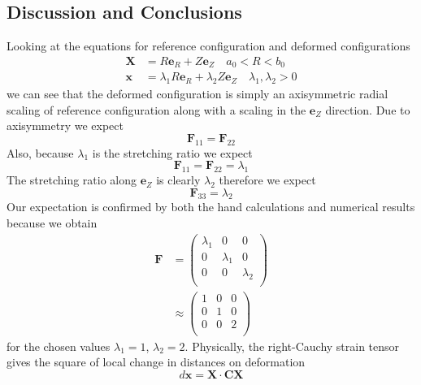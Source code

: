\documentclass[../main.tex]{subfiles}
\begin{document}
        \subsection{Discussion and Conclusions}
        Looking at the equations for reference configuration and
        deformed configurations
        \begin{align*}
          \mathbf{X} &= R\mathbf{e}_R + Z\mathbf{e}_Z\quad a_0<R<b_0\\
          \mathbf{x} &= \lambda_1R\mathbf{e}_R+\lambda_2Z\mathbf{e}_Z\quad \lambda_1,\lambda_2 > 0
        \end{align*}
        we can see that the deformed configuration is simply an
        axisymmetric radial scaling of reference configuration along
        with a scaling in the $\mathbf{e}_Z$ direction. Due to
        axisymmetry we expect
        \[\mathbf{F}_{11} = \mathbf{F}_{22}\]
        Also, because $\lambda_1$ is the stretching ratio we expect
        \[\mathbf{F}_{11}=\mathbf{F}_{22}=\lambda_1\]
        The stretching ratio along $\mathbf{e}_Z$ is clearly
        $\lambda_2$ therefore we expect
        \[\mathbf{F}_{33}=\lambda_2\]
        Our expectation is confirmed by both the hand calculations and
        numerical results because we obtain
        \begin{align*}
          \mathbf{F} &=
                       \begin{pmatrix}
                         \lambda_1 & 0  & 0\\
                         0 & \lambda_1 & 0\\
                         0  &  0  & \lambda_2\\
                       \end{pmatrix}\\ &\approx
                                         \begin{pmatrix}
                                           1 & 0 & 0\\
                                           0 & 1 & 0\\
                                           0 & 0 & 2\\
                                         \end{pmatrix}
        \end{align*}
        for the chosen values $\lambda_1 = 1$, $\lambda_2 = 2$.
        Physically, the right-Cauchy strain tensor gives the square of
        local change in distances on deformation
        \[d\mathbf{x} = \mathbf{X}\cdot\mathbf{C}\mathbf{X}\]
\end{document}
